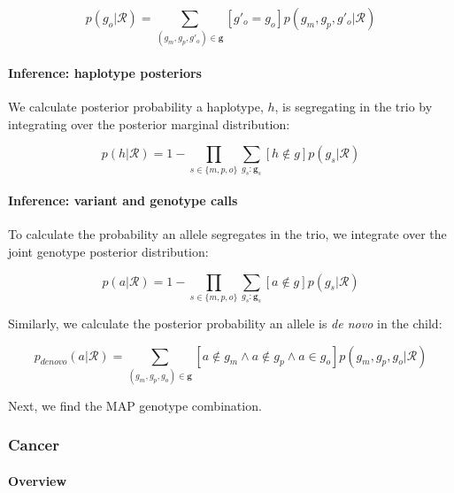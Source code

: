 \documentclass{article}
\begin{document}
\begin{equation}
p(g_o | \mathcal{R}) = \sum_{(g_m, g_p, g'_o) \in \boldsymbol{g}} [g'_o = g_o] p(g_m, g_p, g'_o | \mathcal{R})
\end{equation}

\paragraph{Inference: haplotype posteriors}

We calculate posterior probability a haplotype, $h$, is segregating in the trio by integrating over the posterior marginal distribution:

\begin{equation}
p(h | \mathcal{R}) = 1 - \prod_{s \in \{m, p, o\}}\sum_{g_s : \boldsymbol{g}_s} [h \notin g]p(g_s | \mathcal{R})
\end{equation}

\paragraph{Inference: variant and genotype calls}

To calculate the probability an allele segregates in the trio, we integrate over the joint genotype posterior distribution:

\begin{equation}
p(a | \mathcal{R}) = 1 - \prod_{s \in \{m, p, o\}}\sum_{g_s : \boldsymbol{g}_s} [a \notin g]p(g_s | \mathcal{R})
\end{equation}

Similarly, we calculate the posterior probability an allele is \textit{de novo} in the child:

\begin{equation}
p_{denovo}(a | \mathcal{R}) = \sum_{(g_m, g_p, g_o) \in \boldsymbol{g}} [a \notin g_m \land a \notin g_p \land a \in g_o] p(g_m, g_p, g_o | \mathcal{R})
\end{equation}

Next, we find the MAP genotype combination. 

\subsubsection{Cancer}

\paragraph{Overview}
\end{document}
